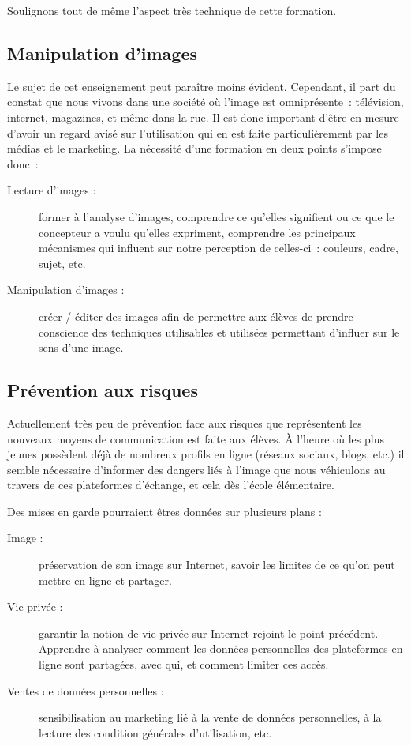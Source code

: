 Soulignons tout de même l'aspect très technique de cette formation.

\subsection{Manipulation d'images}
Le sujet de cet enseignement peut paraître moins évident. Cependant,
il part du constat que nous vivons dans une société où l'image est
omniprésente~: télévision, internet, magazines, et même dans la
rue. Il est donc important d'être en mesure d'avoir un regard avisé
sur l'utilisation qui en est faite particulièrement par les médias et
le marketing. La nécessité d'une formation en deux points s'impose donc~:

\begin{description}
  \item[Lecture d'images :] former à l'analyse d'images, comprendre ce
    qu'elles signifient ou ce que le concepteur a voulu qu'elles expriment,
    comprendre les principaux mécanismes qui influent sur notre
    perception de celles-ci~: couleurs, cadre, sujet, etc.
  \item[Manipulation d'images :] créer / éditer des images afin de
    permettre aux élèves de prendre conscience des techniques
    utilisables et utilisées permettant d'influer sur le sens d'une image.
    
    \cite{book_serusclat}
\end{description}

\subsection{Prévention aux risques}
Actuellement très peu de prévention face aux risques que représentent
les nouveaux moyens de communication est faite aux élèves. À
l'heure où les plus jeunes possèdent déjà de nombreux profils en
ligne (réseaux sociaux, blogs, etc.) il semble nécessaire d'informer
des dangers liés à l'image que nous véhiculons au travers de ces
plateformes d'échange, et cela dès l'école élémentaire.

Des mises en garde pourraient êtres données sur plusieurs plans :

\begin{description}
  \item[Image :] préservation de son image sur Internet, savoir les limites de ce qu'on peut mettre en ligne et partager.
  \item[Vie privée :] garantir la notion de vie privée sur Internet rejoint le point précédent. Apprendre à analyser comment les données personnelles des plateformes en ligne sont partagées, avec qui, et comment limiter ces accès.
  \item[Ventes de données personnelles :] sensibilisation au marketing lié à la vente de données personnelles, à la lecture des condition générales d'utilisation, etc.
\end{description}

